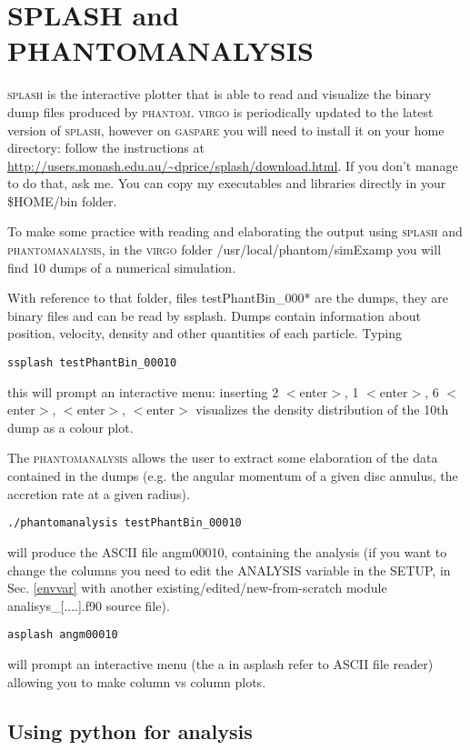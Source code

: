 \documentclass[10pt,a4paper,twoside]{article} %
\begin{document}
\section{SPLASH and PHANTOMANALYSIS}\label{phansplash}

\textsc{splash} is the interactive plotter that is able to read and visualize the binary dump files produced by \textsc{phantom}. 
\textsc{virgo} is periodically updated to the latest version of \textsc{splash}, however on \textsc{gaspare} you will need to install it on your home directory: follow the instructions at \url{http://users.monash.edu.au/~dprice/splash/download.html}. If you don't manage to do that, ask me. You can copy my executables and libraries directly in your \$HOME/bin folder.

To make some practice with reading and elaborating the output using \textsc{splash} and \textsc{phantomanalysis}, in the \textsc{virgo} folder /usr/local/phantom/simExamp you will find 10 dumps of a numerical simulation.

With reference to that folder, files testPhantBin\_000* are the dumps, they are binary files and can be read by ssplash. Dumps contain information about position, velocity, density and other quantities of each particle.
Typing
\begin{verbatim}
ssplash testPhantBin_00010
\end{verbatim}
this will prompt an interactive menu: inserting 2 $<$enter$>$, 1 $<$enter$>$, 6 $<$enter$>$, $<$enter$>$, $<$enter$>$ visualizes the density distribution of the 10th dump as a colour plot.

The \textsc{phantomanalysis} allows the user to extract some elaboration of the data contained in the dumps (e.g. the angular momentum of a given disc annulus, the accretion rate at a given radius). 
\begin{verbatim}
./phantomanalysis testPhantBin_00010
\end{verbatim}
will produce the ASCII file angm00010, containing the analysis (if you want to change the columns you need to edit the ANALYSIS variable in the SETUP, in Sec. \ref{envvar} with another existing/edited/new-from-scratch module analisys\_[....].f90 source file).
\begin{verbatim}
asplash angm00010
\end{verbatim}
will prompt an interactive menu (the a in asplash refer to ASCII file reader) allowing you to make column vs column plots.

\subsection{Using python for analysis}
\end{document}
